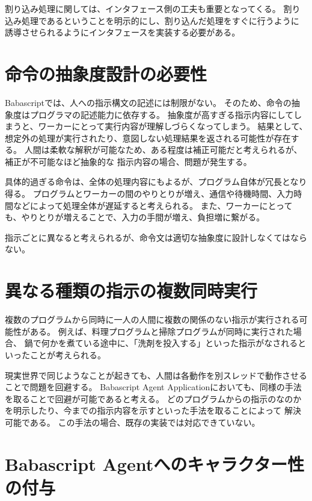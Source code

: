 割り込み処理に関しては、インタフェース側の工夫も重要となってくる。
割り込み処理であるということを明示的にし、割り込んだ処理をすぐに行うように
誘導させられるようにインタフェースを実装する必要がある。

\section{命令の抽象度設計の必要性}\label{ux547dux4ee4ux306eux62bdux8c61ux5ea6ux8a2dux8a08ux306eux5fc5ux8981ux6027}

Babascriptでは、人への指示構文の記述には制限がない。
そのため、命令の抽象度はプログラマの記述能力に依存する。
抽象度が高すぎる指示内容にしてしまうと、ワーカーにとって実行内容が理解しづらくなってしまう。
結果として、想定外の処理が実行されたり、意図しない処理結果を返される可能性が存在する。
人間は柔軟な解釈が可能なため、ある程度は補正可能だと考えられるが、補正が不可能なほど抽象的な
指示内容の場合、問題が発生する。

具体的過ぎる命令は、全体の処理内容にもよるが、プログラム自体が冗長となり得る。
プログラムとワーカーの間のやりとりが増え、通信や待機時間、入力時間などによって処理全体が遅延すると考えられる。
また、ワーカーにとっても、やりとりが増えることで、入力の手間が増え、負担増に繋がる。

指示ごとに異なると考えられるが、命令文は適切な抽象度に設計しなくてはならない。

\section{異なる種類の指示の複数同時実行}\label{ux7570ux306aux308bux7a2eux985eux306eux6307ux793aux306eux8907ux6570ux540cux6642ux5b9fux884c}

複数のプログラムから同時に一人の人間に複数の関係のない指示が実行される可能性がある。
例えば、料理プログラムと掃除プログラムが同時に実行された場合、
鍋で何かを煮ている途中に、「洗剤を投入する」といった指示がなされるといったことが考えられる。

現実世界で同じようなことが起きても、人間は各動作を別スレッドで動作させることで問題を回避する。
Babascript Agent
Applicationにおいても、同様の手法を取ることで回避が可能であると考える。
どのプログラムからの指示のなのかを明示したり、今までの指示内容を示すといった手法を取ることによって
解決可能である。 この手法の場合、既存の実装では対応できていない。

\section{Babascript
Agentへのキャラクター性の付与}\label{babascript-agentux3078ux306eux30adux30e3ux30e9ux30afux30bfux30fcux6027ux306eux4ed8ux4e0e}

